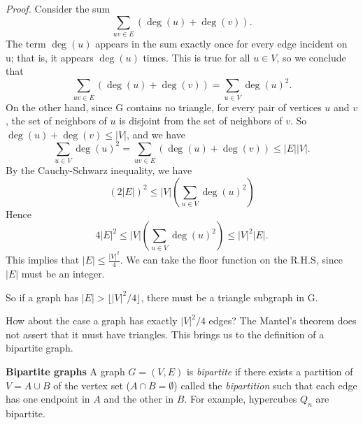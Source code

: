 \documentclass{tufte-handout}
\begin{document}
\textit{Proof.} Consider the sum \[ \sum_{uv\in E}\left(\deg(u)+\deg(v)\right).\]
The term \( \deg(u) \) appears in the sum exactly once for every edge incident on u; that is, it
appears \( \deg(u) \) times. This is true for all \( u \in V \), so we conclude that
\[ \sum_{uv\in E}\left(\deg(u)+\deg(v)\right) = \sum_{u\in V}\deg(u)^2.\]
On the other hand, since G contains no triangle, for every pair of vertices \( u\) and \( v \), the set
of neighbors of \( u \) is disjoint from the set of neighbors of \( v \). So \( \deg(u) +\deg(v) \leq \left|V\right| \), and we have
\[ \sum_{u\in V}\deg(u)^2=\sum_{uv\in E}\left(\deg(u)+\deg(v)\right) \leq \left|E\right|\left|V\right|.\]
By the Cauchy-Schwarz inequality, we have
\[(2\left|E\right|)^2\leq \left|V\right|\left(\sum_{u\in V}\deg(u)^2\right)\]
Hence \[4\left|E\right|^2\leq\left|V\right|\left(\sum_{u\in V}\deg(u)^2\right)\leq \left|V\right|^2\left|E\right|.\]
This implies that \( \left|E\right|\leq \frac{\left|V\right|^2}{4} \).
We can take the floor function on the R.H.S, since \( \left|E\right| \) must be an integer.\qedsymbol

So if a graph has \(\left|E\right| > \lfloor \left|V\right|^2\slash 4 \rfloor \), there must be a triangle subgraph in G.

How about the case a graph has exactly \(\left|V\right|^2\slash 4 \) edges? 
The Mantel's theorem does not assert that it must have triangles.
This brings us to the definition of a bipartite graph.

\textbf{Bipartite graphs} A graph \( G = (V,E) \) is \textit{bipartite} if there exists
a partition of \( V = A \cup B \) of the vertex set (\( A\cap B = \emptyset\)) called the \textit{bipartition}
such that each edge has one endpoint in \( A \) and the other in \( B \).
For example, hypercubes \( Q_n \) are bipartite.
\end{document}
